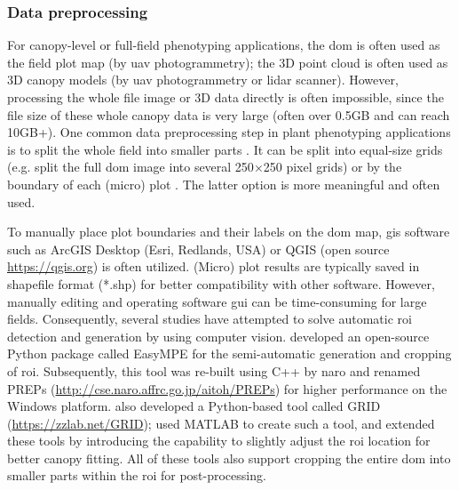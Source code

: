 \subsubsection{Data preprocessing} \label{sec:prepro}

For canopy-level or full-field phenotyping applications, the \gls{dom} is often used as the field plot map (by \gls{uav} photogrammetry); the 3D point cloud is often used as 3D canopy models (by \gls{uav} photogrammetry or \gls{lidar} scanner). However, processing the whole file image or 3D data directly is often impossible, since the file size of these whole canopy data is very large (often over 0.5GB and can reach 10GB+). One common data preprocessing step in plant phenotyping applications is to split the whole field into smaller parts \citep{wang_easyidp_2021}. It can be split into equal-size grids (e.g. \citet{bauer_combining_2019} split the full \gls{dom} image into several 250$\times$250 pixel grids) or by the boundary of each (micro) plot \citep{tresch_easympe_2019}. The latter option is more meaningful and often used.

To manually place plot boundaries and their labels on the \gls{dom} map, \gls{gis} software such as ArcGIS Desktop (Esri, Redlands, USA) or QGIS (open source \url{https://qgis.org}) is often utilized. (Micro) plot results are typically saved in shapefile format (*.shp) for better compatibility with other software. However, manually editing and operating software \gls{gui} can be time-consuming for large fields. Consequently, several studies have attempted to solve automatic \gls{roi} detection and generation by using computer vision. \citet{tresch_easympe_2019} developed an open-source Python package called EasyMPE for the semi-automatic generation and cropping of \gls{roi}. Subsequently, this tool was re-built using C++ by \gls{naro} and renamed PREPs (\url{http://cse.naro.affrc.go.jp/aitoh/PREPs}) for higher performance on the Windows platform. \citet{chen_grid_2020} also developed a Python-based tool called GRID (\url{https://zzlab.net/GRID}); \citet{mortensen_drone_2019} used MATLAB to create such a tool, and \citet{sara_automatic_2021} extended these tools by introducing the capability to slightly adjust the \gls{roi} location for better canopy fitting. All of these tools also support cropping the entire \gls{dom} into smaller parts within the \gls{roi} for post-processing.

